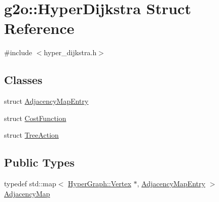 \hypertarget{structg2o_1_1_hyper_dijkstra}{}\section{g2o\+:\+:Hyper\+Dijkstra Struct Reference}
\label{structg2o_1_1_hyper_dijkstra}


{\ttfamily \#include $<$hyper\+\_\+dijkstra.\+h$>$}

\subsection*{Classes}
\begin{DoxyCompactItemize}
\item 
struct \mbox{\hyperlink{structg2o_1_1_hyper_dijkstra_1_1_adjacency_map_entry}{Adjacency\+Map\+Entry}}
\item 
struct \mbox{\hyperlink{structg2o_1_1_hyper_dijkstra_1_1_cost_function}{Cost\+Function}}
\item 
struct \mbox{\hyperlink{structg2o_1_1_hyper_dijkstra_1_1_tree_action}{Tree\+Action}}
\end{DoxyCompactItemize}
\subsection*{Public Types}
\begin{DoxyCompactItemize}
\item 
typedef std\+::map$<$ \mbox{\hyperlink{classg2o_1_1_hyper_graph_1_1_vertex}{Hyper\+Graph\+::\+Vertex}} $\ast$, \mbox{\hyperlink{structg2o_1_1_hyper_dijkstra_1_1_adjacency_map_entry}{Adjacency\+Map\+Entry}} $>$ \mbox{\hyperlink{structg2o_1_1_hyper_dijkstra_af12ff8eef95094815a3fa1da0514bda2}{Adjacency\+Map}}
\end{DoxyCompactItemize}
